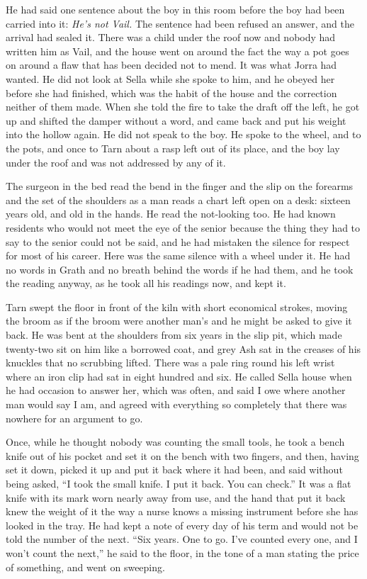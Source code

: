 He had said one sentence about the boy in this room before the boy had been carried into it: \emph{He's not Vail.} The sentence had been refused an answer, and the arrival had sealed it. There was a child under the roof now and nobody had written him as Vail, and the house went on around the fact the way a pot goes on around a flaw that has been decided not to mend. It was what Jorra had wanted. He did not look at Sella while she spoke to him, and he obeyed her before she had finished, which was the habit of the house and the correction neither of them made. When she told the fire to take the draft off the left, he got up and shifted the damper without a word, and came back and put his weight into the hollow again. He did not speak to the boy. He spoke to the wheel, and to the pots, and once to Tarn about a rasp left out of its place, and the boy lay under the roof and was not addressed by any of it.

The surgeon in the bed read the bend in the finger and the slip on the forearms and the set of the shoulders as a man reads a chart left open on a desk: sixteen years old, and old in the hands. He read the not-looking too. He had known residents who would not meet the eye of the senior because the thing they had to say to the senior could not be said, and he had mistaken the silence for respect for most of his career. Here was the same silence with a wheel under it. He had no words in Grath and no breath behind the words if he had them, and he took the reading anyway, as he took all his readings now, and kept it.

\scenebreak

Tarn swept the floor in front of the kiln with short economical strokes, moving the broom as if the broom were another man's and he might be asked to give it back. He was bent at the shoulders from six years in the slip pit, which made twenty-two sit on him like a borrowed coat, and grey Ash sat in the creases of his knuckles that no scrubbing lifted. There was a pale ring round his left wrist where an iron clip had sat in eight hundred and six. He called Sella house when he had occasion to answer her, which was often, and said I owe where another man would say I am, and agreed with everything so completely that there was nowhere for an argument to go.

Once, while he thought nobody was counting the small tools, he took a bench knife out of his pocket and set it on the bench with two fingers, and then, having set it down, picked it up and put it back where it had been, and said without being asked, “I took the small knife. I put it back. You can check.” It was a flat knife with its mark worn nearly away from use, and the hand that put it back knew the weight of it the way a nurse knows a missing instrument before she has looked in the tray. He had kept a note of every day of his term and would not be told the number of the next. “Six years. One to go. I've counted every one, and I won't count the next,” he said to the floor, in the tone of a man stating the price of something, and went on sweeping.

